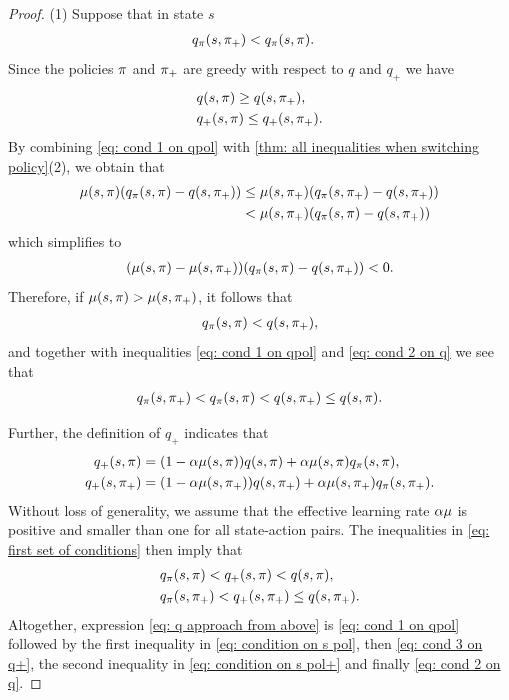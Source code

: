 \begin{proof}
(1) Suppose that in state $s$
\begin{align}
    \label{eq: cond 1 on qpol}
    &q_{\pi}(s, \pi_+) < q_{\pi}(s, \pi) .
\end{align}
Since the policies $\pi$ and $\pi_+$ are greedy with respect to $q$ and $q_+$ we have
\begin{align}
    \label{eq: cond 2 on q}
    &q(s, \pi) \geq q(s, \pi_+) ,
    \\
    \label{eq: cond 3 on q+}
    &q_+(s, \pi) \leq q_+(s, \pi_+) .
\end{align}
By combining \eqref{eq: cond 1 on qpol} with \autoref{thm: all inequalities when switching policy}(2), we obtain that
\begin{align*}
    \mu(s, \pi) ( q_{\pi}(s, \pi) - q(s, \pi_+) )
    &\leq
    \mu(s, \pi_+) ( q_{\pi}(s, \pi_+) - q(s, \pi_+) )
    \\
    &< 
    \mu(s, \pi_+) ( q_{\pi}(s, \pi) - q(s, \pi_+) )
\end{align*}
which simplifies to
\begin{align*}
    ( \mu(s, \pi) - \mu(s, \pi_+) )
    ( q_{\pi}(s, \pi) - q(s, \pi_+) ) < 0.
\end{align*}
Therefore, if $\mu(s, \pi) > \mu(s, \pi_+)$, it follows that
\begin{align*}
    q_{\pi}(s, \pi)
    <
    q(s, \pi_+) ,
\end{align*}
and together with inequalities \eqref{eq: cond 1 on qpol} and \eqref{eq: cond 2 on q} we see that
\begin{align}
\label{eq: first set of conditions}
    q_{\pi}(s, \pi_+)
    < q_{\pi}(s, \pi)
    < q(s, \pi_+) 
    \leq q(s, \pi) .
\end{align}

Further, the definition of $q_+$ indicates that
\begin{align*}
    q_+(s, \pi)
    &= ( 1 - \alpha \mu(s, \pi) ) q(s, \pi) 
    + \alpha \mu(s, \pi) q_{\pi}(s, \pi) ,
    \\
    q_+(s, \pi_+)
    &= ( 1 - \alpha \mu(s, \pi_+) ) q(s, \pi_+) 
    + \alpha \mu(s, \pi_+) q_{\pi}(s, \pi_+) .
\end{align*}
Without loss of generality, we assume that the effective learning rate $\alpha \mu$ is positive and smaller than one for all state-action pairs.
The inequalities in \eqref{eq: first set of conditions} then imply that
\begin{align}
\label{eq: condition on s pol}
    &q_{\pi}(s, \pi) < q_+(s, \pi) < q(s, \pi) ,
    \\
\label{eq: condition on s pol+}
    &q_{\pi}(s, \pi_+) < q_+(s, \pi_+) \leq q(s, \pi_+) .
\end{align}
Altogether, expression \eqref{eq: q approach from above} is \eqref{eq: cond 1 on qpol} followed by the first inequality in \eqref{eq: condition on s pol}, then \eqref{eq: cond 3 on q+}, the second inequality in \eqref{eq: condition on s pol+} and finally \eqref{eq: cond 2 on q}.



\end{proof}
